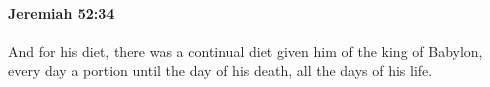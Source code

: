 		\paragraph{Jeremiah 52:34} %
			\label{JEREMIAH-52-34}

			And for his diet, there was a continual diet given him of the king of Babylon, every day a portion until the day of his death, all the days of his life.

